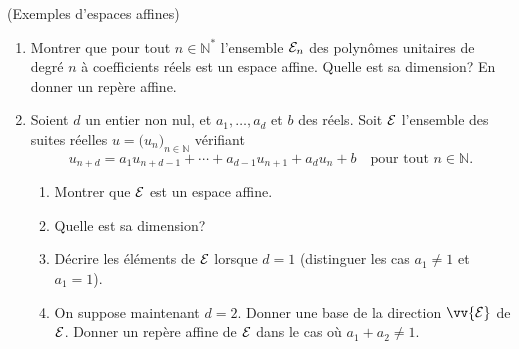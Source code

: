 \documentclass[a4paper,12pt,reqno]{amsart}
\begin{document}
\begin{exo} (Exemples d'espaces affines)
  \begin{enumerate}
    \item Montrer que pour tout $n \in \mathbb{N}^\ast$ l'ensemble $\mathcal{E}_{n}$ des polynômes unitaires de degré $n$ à coefficients réels est un espace affine. Quelle est sa dimension? En donner un repère affine.
    \item Soient $d$ un entier non nul, et $a_1,\ldots, a_d$ et $b$ des réels. Soit $\mathcal{E}$ l'ensemble des suites réelles $u=\big(u_n\big)_{n \in \mathbb{N}}$ vérifiant
      \[
        u_{n+d} = a_{1} u_{n+d-1} + \cdots + a_{d-1} u_{n+1} + a_d u_n + b \quad \text{pour tout }n \in \mathbb{N}.
      \]
      \begin{enumerate}
        \item Montrer que $\mathcal{E}$ est un espace affine.
        \item Quelle est sa dimension?
        \item\hard Décrire les éléments de $\mathcal{E}$ lorsque $d=1$ (distinguer les cas $a_1 \neq 1$ et $a_1=1$).
        \item\hard On suppose maintenant $d=2$. Donner une base de la direction $\vv{\ens{E}}$ de $\mathcal{E}$. Donner un repère affine de $\mathcal{E}$ dans le cas où $a_1+a_2 \neq 1$.
      \end{enumerate}
    \end{enumerate}
\end{exo}
\end{document}

